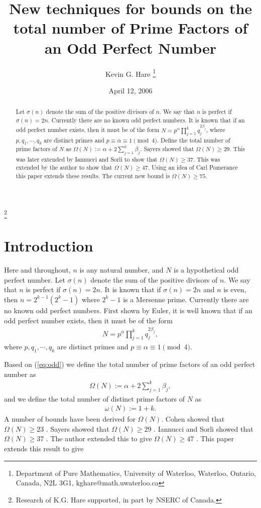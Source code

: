 \documentclass{article}
\title%
    {New techniques for bounds on the total number of Prime Factors of an 
     Odd Perfect Number}
\author{Kevin G. Hare
\footnote{Department of Pure Mathematics, University of Waterloo, Waterloo,
    Ontario, Canada,  N2L 3G1, kghare@math.uwaterloo.ca}}
\date{April 12, 2006}
\begin{document}
\maketitle
\thanks{Research of K.G. Hare supported, in part by NSERC of Canada.}

\begin{abstract}
Let $\sigma(n)$ denote the sum of the positive divisors of $n$.
We say that $n$ is perfect if $\sigma(n) = 2 n$.
Currently there are no known odd perfect numbers.
It is known that if an odd perfect number exists, then it must be 
    of the form $N = p^\alpha \prod_{j=1}^k q_j^{2 \beta_j}$, where
    $p, q_1, \cdots, q_k$ are distinct primes and 
    $p \equiv \alpha\equiv 1 \pmod{4}$.
Define the total number of prime factors of $N$ as 
    $\Omega(N) := \alpha + 2 \sum_{j=1}^k \beta_j$.
Sayers showed that $\Omega(N) \geq 29$.
This was later extended by Iannucci and Sorli to show that $\Omega(N) \geq 37$.
This was extended by the author to show that $\Omega(N) \geq 47$.
Using an idea of Carl Pomerance this paper extends these results.
The current new bound is $\Omega(N) \geq 75$.
\end{abstract}



\section{Introduction}

Here and throughout, $n$ is any natural number, and $N$ is a hypothetical 
    odd perfect number.
Let $\sigma(n)$ denote the sum of the positive divisors of $n$.
We say that $n$ is perfect if $\sigma(n) = 2 n$.
It is known that if $\sigma(n) = 2n $ and $n$ is even, then 
    $n = 2^{k-1} (2^k-1)$ where $2^k-1$ is a Mersenne prime.
Currently there are no known odd perfect numbers.
First shown by Euler, it is well known that if 
    an odd perfect number exists, then it must be 
    of the form 
\begin{eqnarray}
N = p^\alpha \prod_{j=1}^k q_j^{2 \beta_j},
\label{eq:odd}
\end{eqnarray} where
    $p, q_1, \cdots, q_k$ are distinct primes and 
    $p \equiv \alpha\equiv 1 \pmod{4}$.

Based on (\ref{eq:odd}) we define the total number of prime factors 
    of an odd perfect number as
\begin{eqnarray}
\Omega(N) := \alpha + 2 \sum_{j=1}^k \beta_j,
\label{eq:Omega}
\end{eqnarray}
and we define the total number of distinct prime factors of $N$ as
    \begin{eqnarray} \omega(N) := 1 + k. \label{eq:omega} \end{eqnarray}
A number of bounds have been derived for $\Omega(N)$.
Cohen showed that $\Omega(N) \geq 23$ \cite{Cohen82}.
Sayers showed that $\Omega(N) \geq 29$ \cite{Sayers86}.
Iannucci and Sorli showed that $\Omega(N) \geq 37$ \cite{IannucciSorli03}.
The author extended this to give $\Omega(N) \geq 47$ \cite{Hare05a}.
This paper extends this result to give
\end{document}
